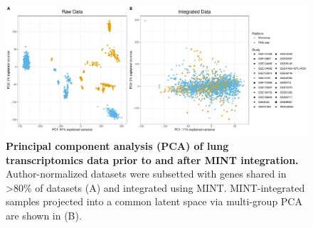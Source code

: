 \documentclass[
]{article}
\begin{document}
\begin{figure}

{\centering \includegraphics[width=1\linewidth,]{./Figures/SysReview/Figure2_PCA} 

}

\caption[Data integration via MINT]{\textbf{Principal component analysis (PCA) of lung transcriptomics data prior to and after MINT integration.} Author-normalized datasets were subsetted with genes shared in \textgreater80\% of datasets (A) and integrated using MINT. MINT-integrated samples projected into a common latent space via multi-group PCA are shown in (B).}\label{fig:integration}
\end{figure}
\end{document}
